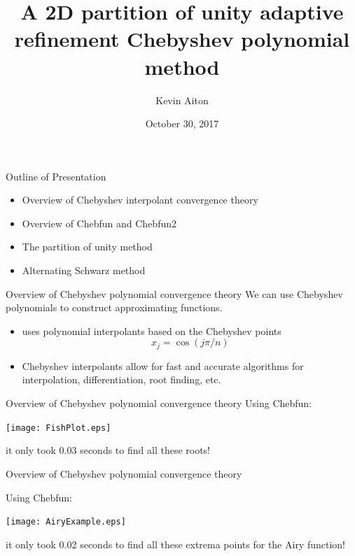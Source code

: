 \documentclass{beamer}
\title[Optimal Domain Splitting]{A 2D partition of unity adaptive refinement Chebyshev polynomial method}
\author[K. Aiton]{Kevin Aiton}
\institute[UD]{
  Department of Mathematics\\
University of Delaware\\
}
\date[October 2016]{October 30, 2017}
\begin{document}
%
%
\begin{frame}[plain]
  \titlepage
\end{frame}

%
%

\begin{frame}[plain]{Outline of Presentation}

\begin{itemize}
	\item Overview of Chebyshev interpolant convergence theory
	\item Overview of Chebfun and Chebfun2
	\item The partition of unity method
	\item Alternating Schwarz method
\end{itemize}
\end{frame}

%
%
\begin{frame}{Overview of Chebyshev polynomial convergence theory}
We can use Chebyshev polynomials to construct approximating functions.
\begin{itemize}
\item {} uses polynomial interpolants based on the Chebyshev points $$x_j = \cos(j\pi/n)$$	
\item Chebyshev interpolants allow for fast and accurate algorithms for
interpolation, differentiation, root finding, etc.
\end{itemize}
\end{frame}

\begin{frame}{Overview of Chebyshev polynomial convergence theory}
Using Chebfun:	
\bigskip

\begin{center}
\texttt{[image: FishPlot.eps]}
\end{center}
\begin{center}
it only took 0.03 seconds to find all these roots!	
\end{center}

\end{frame}

\begin{frame}{Overview of Chebyshev polynomial convergence theory}

Using Chebfun:	
\bigskip

\begin{center}
\texttt{[image: AiryExample.eps]}
\end{center}
\begin{center}
it only took 0.02 seconds to find all these extrema points for the Airy function!	
\end{center}

\end{frame}
\end{document}
